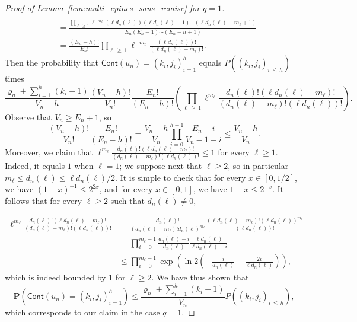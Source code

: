 \documentclass[AHL,Unicode,longabstracts,published]{cedram}
\newcommand{\ensembles}[1]{\mathbf{#1}}
\renewcommand{\P}{\ensembles{P}}
\renewcommand{\Pr}[1]{\P\left(#1\right)}
\newcommand{\1}{\ensembles{1}}
\renewcommand{\le}{\leqslant}
\renewcommand{\ge}{\geqslant}
\newcommand{\Cont}{\mathsf{Cont}}
\newcommand{\edges}{E}
\newcommand{\vertices}{V}
\begin{document}
\begin{proof}[Proof of Lemma~\ref{lem:multi_epines_sans_remise} for $q = 1$]
\begin{align*}
\\
&= \frac{\prod_{\ell\,\ge\,1} \ell^{- m_\ell} \left(\ell d_n(\ell)\right) \left(\ell d_n(\ell) - 1\right) \cdots \left(\ell d_n(\ell) - m_\ell + 1\right)}{\edges_n (\edges_n - 1) \cdots (\edges_n - h + 1)}
\\
&= \frac{(\edges_n - h)!}{\edges_n!} \prod_{\ell\,\ge\,1} \ell^{- m_\ell} \frac{\left(\ell d_n(\ell)\right)!}{\left(\ell d_n(\ell) - m_\ell\right)!}.
\end{align*}
Then the probability that $\Cont(u_n) = (k_i, j_i)_{i=1}^h$ equals $P((k_i, j_i)_{i\,\le\,h})$ times
\[
\frac{\varrho_n + \sum\limits_{i=1}^h (k_i - 1)}{\vertices_n-h} \frac{(\vertices_n-h)!}{\vertices_n!}
\frac{\edges_n!}{(\edges_n - h)!}
\left(\prod_{\ell\,\ge\,1} \ell^{m_\ell} \frac{d_n(\ell)! \left(\ell d_n(\ell) - m_\ell\right)!}{\left(d_n(\ell)-m_\ell\right)! \left(\ell d_n(\ell)\right)!}\right).
\]
Observe that $\vertices_n \ge \edges_n + 1$, so
\[
\frac{(\vertices_n-h)!}{\vertices_n!} \frac{\edges_n!}{(\edges_n - h)!} = \frac{\vertices_n-h}{\vertices_n} \prod_{i=0}^{h-1} \frac{\edges_n - i}{\vertices_n - 1 - i}
\le \frac{\vertices_n-h}{\vertices_n}.
\]
Moreover, we claim that $\ell^{m_\ell} \frac{d_n(\ell)! (\ell d_n(\ell) - m_\ell)!}{(d_n(\ell)-m_\ell)! (\ell d_n(\ell))!} \le 1$ for every $\ell \ge 1$. Indeed, it equals $1$ when $\ell=1$; we suppose next that $\ell \ge 2$, so in particular $m_\ell \le d_n(\ell) \le \ell d_n(\ell) / 2$. It is simple to check that for every $x \in [0, 1/2]$, we have $(1-x)^{-1} \le 2^{2x}$, and for every $x \in [0, 1]$, we have $1-x \le 2^{-x}$. It follows that for every $\ell \ge 2$ such that $d_n(\ell) \ne 0$,

\begin{align*}
\ell^{m_\ell} \frac{d_n(\ell)! \left(\ell d_n(\ell)-m_\ell\right)!}{\left(d_n(\ell)-m_\ell\right)! \left(\ell d_n(\ell)\right)!} &= \frac{d_n(\ell)!}{\left(d_n(\ell)-m_\ell\right)! d_n(\ell)^{m_\ell}} \frac{\left(\ell d_n(\ell)-m_\ell\right)! \left(\ell d_n(\ell)\right)^{m_\ell}}{\left(\ell d_n(\ell)\right)!}
\\
&= \prod_{i = 0}^{m_\ell-1} \frac{d_n(\ell) - i}{d_n(\ell)} \frac{\ell d_n(\ell)}{\ell d_n(\ell) - i}
\\
&\le \prod_{i = 0}^{m_\ell-1}
\exp\left(\ln 2 \left(-\frac{i}{d_n(\ell)} + \frac{2i}{\ell d_n(\ell)}\right)\right),
\end{align*}
which is indeed bounded by $1$ for $\ell \ge 2$. We have thus shown that
\[
\Pr{\Cont(u_n) = (k_i, j_i)_{i=1}^h} \le \frac{\varrho_n + \sum\limits_{i=1}^h \left(k_i - 1\right)}{\vertices_n} P\left((k_i, j_i)_{i\,\le\,h}\right),
\]
which corresponds to our claim in the case $q=1$.
\end{proof}
\end{document}
